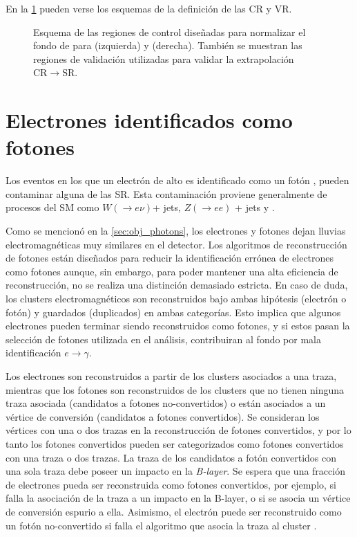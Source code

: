 En la \cref{fig:bkg_crq} pueden verse los esquemas de la definición de las CR y VR.

\begin{figure}[!htbp]
  \centering

  \resizebox{0.49\textwidth}{!}{}
  \resizebox{0.49\textwidth}{!}{}

  \caption{Esquema de las regiones de control diseñadas para normalizar el fondo
    de {\gjet} para {\SRL} (izquierda) y {\SRH} (derecha). También se muestran
    las regiones de validación utilizadas para validar la extrapolación
    $\mathrm{CR}\to\mathrm{SR}$.}
  \label{fig:bkg_crq}
\end{figure}



\section{Electrones identificados como fotones} \label{sec:efakes}

Los eventos en los que un electrón de alto {\pt} es identificado como un
fotón \cite{Bocci:1643300}, pueden contaminar alguna de las SR. Esta contaminación
proviene generalmente de procesos del SM como $W(\to e\nu)$+ jets, $Z(\to ee)$ +
jets y {\ttbar}.

Como se mencionó en la \cref{sec:obj_photons}, los electrones y fotones dejan
lluvias electromagnéticas muy similares en el detector. Los algoritmos de
reconstrucción de fotones están diseñados para reducir la identificación errónea
de electrones como fotones aunque, sin embargo, para poder mantener una alta
eficiencia de reconstrucción, no se realiza una distinción demasiado estricta. En
caso de duda, los clusters electromagnéticos son reconstruidos bajo ambas
hipótesis (electrón o fotón) y guardados (duplicados) en ambas categorías. Esto
implica que algunos electrones pueden terminar siendo reconstruidos como fotones, y si estos
pasan la selección de fotones utilizada en el
análisis, contribuiran al fondo por mala identificación $e\to\gamma$.

Los electrones son reconstruidos a partir de los clusters asociados a una traza, mientras
que los fotones son reconstruidos de los clusters que no tienen ninguna traza
asociada (candidatos a fotones no-convertidos) o están asociados a un vértice de
conversión (candidatos a fotones convertidos). Se consideran los vértices con
una o dos trazas en la reconstrucción de fotones convertidos, y por lo tanto los
fotones convertidos pueden ser categorizados como fotones convertidos con una
traza o dos trazas. La traza de los candidatos a fotón convertidos con una sola
traza debe poseer un impacto en la \emph{B-layer}. Se espera que una fracción de
electrones pueda ser reconstruida como fotones convertidos, por ejemplo, si
falla la asociación de la traza a un impacto en la B-layer, o si se asocia un
vértice de conversión espurio a ella. Asimismo, el electrón puede ser reconstruido como un fotón
no-convertido si falla el algoritmo que asocia
la traza al cluster .


